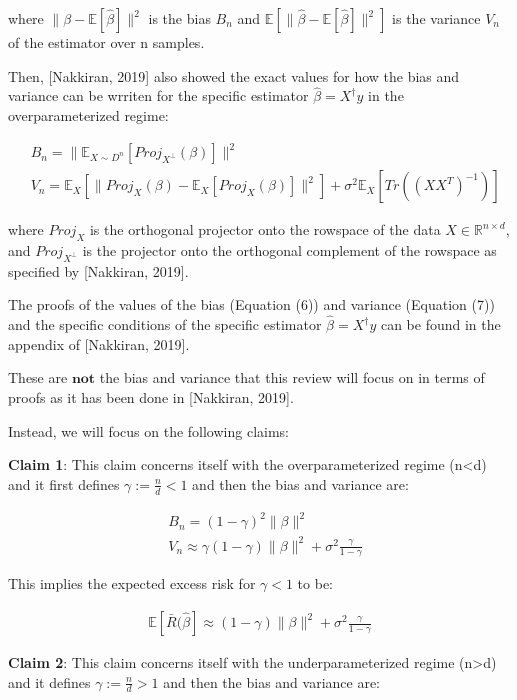 \documentclass{article}
\begin{document}
where $\|\beta - \mathbb{E}[\hat{\beta}]\|^2$ is the bias $B_n$ and $\mathbb{E} [\|\hat{\beta} - \mathbb{E} [\hat{\beta}]\|^2]$ is the variance $V_n$ of the estimator over n samples.

Then, [Nakkiran, 2019] also showed the exact values for how the bias and variance can be wrriten for the specific estimator $\hat{\beta} = X^{\dagger}y$ in the overparameterized regime:

\begin{align}
    &B_n = \| \mathbb{E}_{X \sim D^n} [Proj_{X^{\perp}} (\beta)] \|^2\\
    &V_n = \mathbb{E}_X [\|Proj_{X} (\beta) - \mathbb{E}_X [Proj_X (\beta)]\|^2] + \sigma^2 \mathbb{E}_X [Tr((XX^T)^{-1})]
\end{align}

where $Proj_X$ is the orthogonal projector onto the rowspace of the data $X\in\mathbb{R}^{n \times d}$, and $Proj_{X^{\perp}}$ is the projector onto the orthogonal complement of the rowspace as specified by [Nakkiran, 2019].

The proofs of the values of the bias (Equation (6)) and variance (Equation (7)) and the specific conditions of the specific estimator $\hat{\beta} = X^{\dagger}y$ can be found in the appendix of [Nakkiran, 2019].

These are $\textbf{not}$ the bias and variance that this review will focus on in terms of proofs as it has been done in [Nakkiran, 2019].



Instead, we will focus on the following claims:

\textbf{Claim 1}: This claim concerns itself with the overparameterized regime (n<d) and it first defines $\gamma := \frac{n}{d} < 1$ and then the bias and variance are:

\begin{align}
    &B_n = (1-\gamma)^2 \|\beta\|^2\\
    &V_n \approx \gamma (1-\gamma) \|\beta\|^2 + \sigma^2 \frac{\gamma}{1-\gamma}
\end{align}

This implies the expected excess risk for $\gamma < 1$ to be:

\begin{align}
    \mathbb{E} [\bar{R}(\hat{\beta}] \approx (1-\gamma)\|\beta\|^2 + \sigma^2 \frac{\gamma}{1-\gamma}
\end{align}

\textbf{Claim 2}: This claim concerns itself with the underparameterized regime (n>d) and it defines $\gamma := \frac{n}{d} > 1$ and then the bias and variance are:
\end{document}
